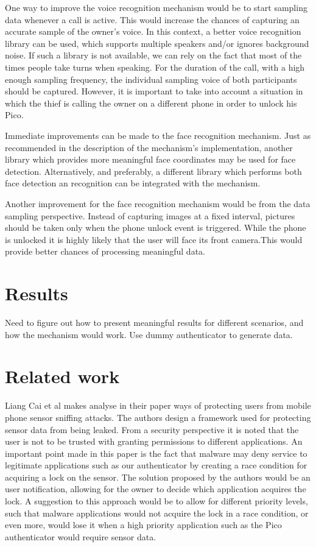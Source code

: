 One way to improve the voice recognition mechanism would be to start sampling data whenever a call is active. This would increase the chances of capturing an accurate sample of the owner's voice. In this context, a better voice recognition library can be used, which supports multiple speakers and/or ignores background noise. If such a library is not available, we can rely on the fact that most of the times people take turns when speaking. For the duration of the call, with a high enough sampling frequency, the individual sampling voice of both participants should be captured. However, it is important to take into account a situation in which the thief is calling the owner on a different phone in order to unlock his Pico.

Immediate improvements can be made to the face recognition mechanism. Just as recommended in the description of the mechanism's implementation, another library which provides more meaningful face coordinates may be used for face detection. Alternatively, and preferably, a different library which performs both face detection an recognition can be integrated with the mechanism.

Another improvement for the face recognition mechanism would be from the data sampling perspective. Instead of capturing images at a fixed interval, pictures should be taken only when the phone unlock event is triggered. While the phone is unlocked it is highly likely that the user will face its front camera.This would provide better chances of processing meaningful data.

\section{Results}
Need to figure out how to present meaningful results for different scenarios, and how the mechanism would work. Use dummy authenticator to generate data.

\section{Related work}
Liang Cai et al makes analyse in their paper \cite{cai2009defending} ways of protecting users from mobile phone sensor sniffing attacks. The authors design a framework used for protecting sensor data from being leaked. From a security perspective it is noted that the user is not to be trusted with granting permissions to different applications. An important point made in this paper is the fact that malware may deny service to legitimate applications such as our authenticator by creating a race condition for acquiring a lock on the sensor. The solution proposed by the authors would be an user notification, allowing for the owner to decide which application acquires the lock. A suggestion to this approach would be to allow for different priority levels, such that malware applications would not acquire the lock in a race condition, or even more, would lose it when a high priority application such as the Pico authenticator would require sensor data.

